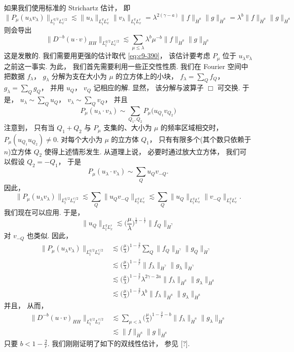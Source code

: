 如果我们使用标准的 Strichartz 估计， 即
\begin{equation}
\|P_\mu(u_\lambda v_\lambda)\|_{L_t^{q/2}L_x^{r/2}} \lesssim \|u_\lambda\|_{L_t^q L_x^r}\|v_\lambda\|_{L_t^q L_x^r} = \lambda^{2(\gamma-a)}\|f\|_{\dot H^a}\|g\|_{\dot H^a} = \lambda^b\|f\|_{\dot H^a}\|g\|_{\dot H^a}\label{eq:c9-390}
\end{equation}
则会导出
\[
\|D^{-b}(u\cdot v)_{HH}\|_{L_t^{q/2}L_x^{r/2}} \lesssim \sum_{\mu\leq\lambda}\lambda^b\mu^{-b}\|f\|_{\dot H^a}\|g\|_{\dot H^a}
\]
这是发散的. 我们需要用更强的估计取代 \eqref{eq:c9-390}， 该估计要考虑 $P_\mu$ 位于 $u_\lambda v_\lambda$ 之前这一事实. 为此， 我们首先需要利用一些正交性性质. 我们在 Fourier 空间中把数据 $f_\lambda$， $g_\lambda$ 分解为支在大小为 $\mu$ 的立方体上的小块， $f_\lambda = \sum_Q f_Q$， $g_\lambda = \sum_Q g_Q$， 并用 $u_Q$， $v_Q$ 记相应的解. 显然， 该分解与波算子 $\Box$ 可交换. 于是， $u_\lambda \sim \sum_Q u_Q$， $v_\lambda \sim \sum_Q v_Q$， 并且
\[
P_\mu(u_\lambda\cdot v_\lambda) \sim \sum_{Q_1, Q_2}P_\mu\big(u_{Q_1}v_{Q_2}\big)
\]
注意到， 只有当 $Q_1 + Q_2$ 与 $P_\mu$ 支集的、大小为 $\mu$ 的频率区域相交时， $P_\mu(u_{Q_1}u_{Q_2}) \neq 0$. 对每个大小为 $\mu$ 的立方体 $Q_1$， 只有有限多个(其个数只依赖于 $n$)立方体 $Q_2$ 使得上述情形发生. 从道理上说， 必要时通过放大立方体， 我们可以假设 $Q_2 = -Q_1$， 于是
\[
P_\mu(u_\lambda\cdot v_\lambda) \sim \sum_Q u_Q v_{-Q}.
\]
因此，
\[
\|P_\mu(u_\lambda v_\lambda)\|_{L_t^{q/2}L_x^{r/2}} \lesssim \sum_Q\|u_Q v_{-Q}\|_{L_t^q L_x^r} \lesssim \sum_Q\|u_Q\|_{L_t^q L_x^r}\|v_{-Q}\|_{L_t^q L_x^r}.
\]
我们现在可以应用. 于是，
\[
\|u_Q\|_{L_t^q L_x^r} \lesssim \big(\frac{\mu}{\lambda}\big)^{\frac{1}{2}-\frac{1}{r}}\|f_Q\|_{\dot H^\gamma}
\]
对 $v_{-Q}$ 也类似. 因此，
\[
\begin{aligned}
\|P_\mu(u_\lambda v_\lambda)\|_{L_t^{q/2}L_x^{r/2}} &\lesssim \big(\frac{\mu}{\lambda}\big)^{1-\frac{2}{r}}\sum_Q\|f_Q\|_{\dot H^\gamma}\|g_Q\|_{\dot H^\gamma}\\
&\lesssim \big(\frac{\mu}{\lambda}\big)^{1-\frac{2}{r}}\|f_\lambda\|_{\dot H^\gamma}\|g_\lambda\|_{\dot H^\gamma}\\
&\lesssim \big(\frac{\mu}{\lambda}\big)^{1-\frac{2}{r}}\lambda^{2\gamma-2a}\|f_\lambda\|_{\dot H^a}\|g_\lambda\|_{\dot H^a}\\
&\lesssim \big(\frac{\mu}{\lambda}\big)^{1-\frac{2}{r}}\lambda^b\|f_\lambda\|_{\dot H^a}\|g_\lambda\|_{\dot H^a}
\end{aligned}
\]
并且， 从而，
\[
\begin{aligned}
\|D^{-b}(u\cdot v)_{HH}\|_{L_t^{q/2}L_x^{r/2}} &\lesssim \sum_{\mu<\lambda}\big(\frac{\mu}{\lambda}\big)^{1-\frac{2}{r}-b}\|f_\lambda\|_{\dot H^a}\|g_\lambda\|_{\dot H^a}\\
&\lesssim \|f\|_{\dot H^a}\|g\|_{\dot H^a}
\end{aligned}
\]
只要 $b < 1 - \frac{2}{r}$. 我们刚刚证明了如下的双线性估计， 参见 [?].

